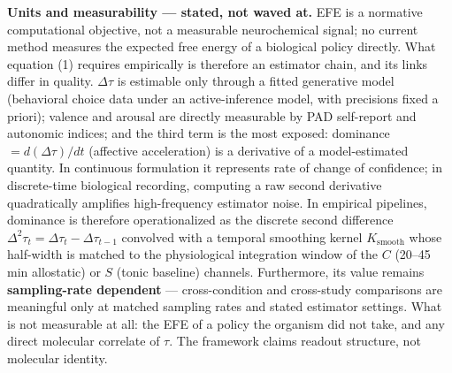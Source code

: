 \documentclass[
]{article}
\begin{document}
\textbf{Units and measurability --- stated, not waved at.} EFE is a
normative computational objective, not a measurable neurochemical
signal; no current method measures the expected free energy of a
biological policy directly. What equation (1) requires empirically is
therefore an estimator chain, and its links differ in quality.
\(\Delta\tau\) is estimable only through a fitted generative model
(behavioral choice data under an active-inference model, with precisions
fixed a priori); valence and arousal are directly measurable by PAD
self-report and autonomic indices; and the third term is the most
exposed: dominance \(= d(\Delta\tau)/dt\) (affective acceleration) is a
derivative of a model-estimated quantity. In continuous formulation it
represents rate of change of confidence; in discrete-time biological
recording, computing a raw second derivative quadratically amplifies
high-frequency estimator noise. In empirical pipelines, dominance is
therefore operationalized as the discrete second difference
\(\Delta^2\tau_t = \Delta\tau_t - \Delta\tau_{t-1}\) convolved with a
temporal smoothing kernel \(K_{\mathrm{smooth}}\) whose half-width is
matched to the physiological integration window of the \(C\) (20--45 min
allostatic) or \(S\) (tonic baseline) channels. Furthermore, its value
remains \textbf{sampling-rate dependent} --- cross-condition and
cross-study comparisons are meaningful only at matched sampling rates
and stated estimator settings. What is not measurable at all: the EFE of
a policy the organism did not take, and any direct molecular correlate
of \(\tau\). The framework claims readout structure, not molecular
identity.
\end{document}
